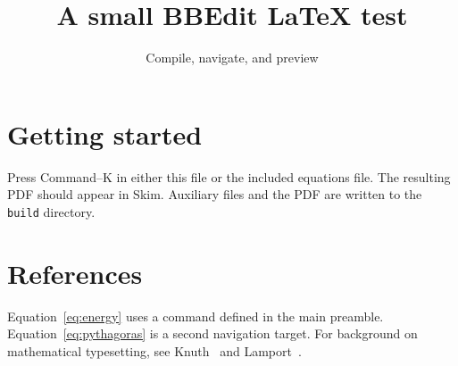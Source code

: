\documentclass[11pt]{article}
\title{A small BBEdit LaTeX test}
\author{Compile, navigate, and preview}
\date{}
\begin{document}
\maketitle

\section{Getting started}
Press Command--K in either this file or the included equations file.
The resulting PDF should appear in Skim. Auxiliary files and the PDF are
written to the \texttt{build} directory.



\section{References}
Equation~\ref{eq:energy} uses a command defined in the main preamble.
Equation~\ref{eq:pythagoras} is a second navigation target.
For background on mathematical typesetting, see Knuth~\cite{knuth1984texbook}
and Lamport~\cite{lamport1994latex}.



\end{document}
